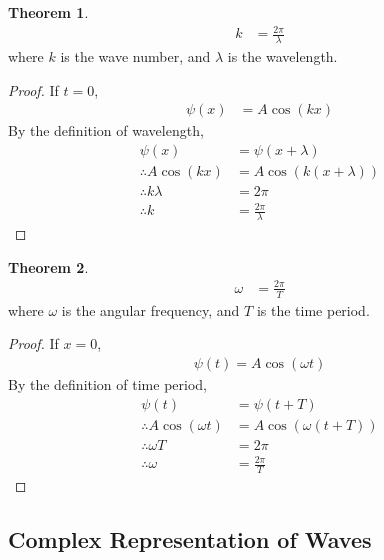 \documentclass[titlepage, fleqn, a4paper, 12pt, twoside]{article}
\theoremstyle{definition}
\theoremstyle{theorem}
\newtheorem{theorem}{Theorem}
\begin{document}
\begin{theorem}
	\begin{align*}
		k & = \frac{2 \pi}{\lambda}
	\end{align*}
	where $k$ is the wave number, and $\lambda$ is the wavelength.
\end{theorem}

\begin{proof}
	If $t = 0$,
	\begin{align*}
		\psi(x) & = A \cos(k x)
	\end{align*}
	By the definition of wavelength,
	\begin{align*}
		\psi(x)                & = \psi(x + \lambda)                    \\
		\therefore A \cos(k x) & = A \cos\left( k (x + \lambda) \right) \\
		\therefore k \lambda   & = 2 \pi                                \\
		\therefore k           & = \frac{2 \pi}{\lambda}
	\end{align*}
\end{proof}

\begin{theorem}
	\begin{align*}
		\omega & = \frac{2 \pi}{T}
	\end{align*}
	where $\omega$ is the angular frequency, and $T$ is the time period.
\end{theorem}

\begin{proof}
	If $x = 0$,
	\begin{align*}
		\psi(t) = A \cos(\omega t)
	\end{align*}
	By the definition of time period,
	\begin{align*}
		\psi(t)                     & = \psi(t + T)                         \\
		\therefore A \cos(\omega t) & = A \cos\left( \omega (t + T) \right) \\
		\therefore \omega T         & = 2 \pi                               \\
		\therefore \omega           & = \frac{2 \pi}{T}
	\end{align*}
\end{proof}

\subsection{Complex Representation of Waves}
\end{document}
